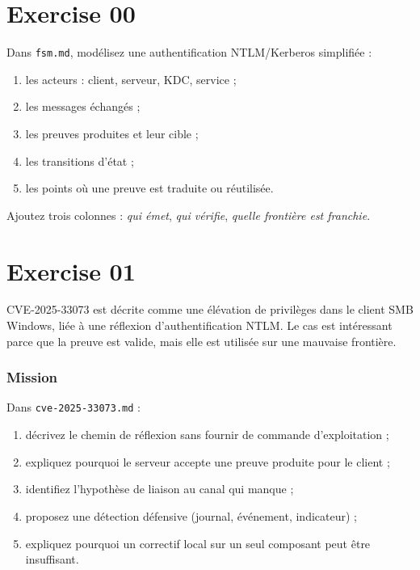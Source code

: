 \documentclass{training}
\begin{document}
\startexercices

\chapter{Exercise 00}
\makeheaderfiles

Dans \texttt{fsm.md}, modélisez une authentification NTLM/Kerberos
simplifiée :

\begin{enumerate}
  \item les acteurs : client, serveur, KDC, service ;
  \item les messages échangés ;
  \item les preuves produites et leur cible ;
  \item les transitions d'état ;
  \item les points où une preuve est traduite ou réutilisée.
\end{enumerate}

Ajoutez trois colonnes : \emph{qui émet}, \emph{qui vérifie}, \emph{quelle
frontière est franchie}.


\chapter{Exercise 01}
\makeheaderfiles

CVE-2025-33073 est décrite comme une élévation de privilèges dans le client
SMB Windows, liée à une réflexion d'authentification NTLM. Le cas est
intéressant parce que la preuve est valide, mais elle est utilisée sur une
mauvaise frontière.

\subsection*{Mission}

Dans \texttt{cve-2025-33073.md} :

\begin{enumerate}
  \item décrivez le chemin de réflexion sans fournir de commande
        d'exploitation ;
  \item expliquez pourquoi le serveur accepte une preuve produite pour le
        client ;
  \item identifiez l'hypothèse de liaison au canal qui manque ;
  \item proposez une détection défensive (journal, événement, indicateur) ;
  \item expliquez pourquoi un correctif local sur un seul composant peut
        être insuffisant.
\end{enumerate}
\end{document}
